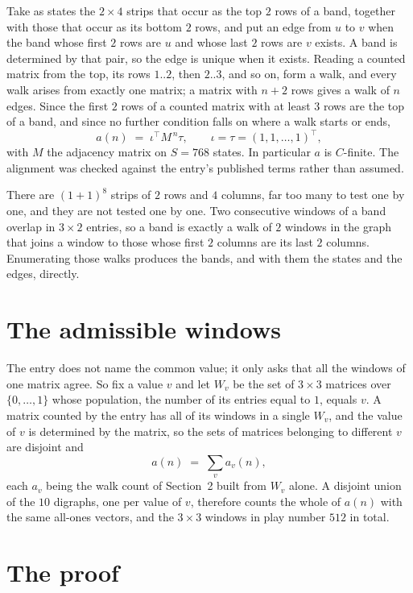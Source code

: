 \documentclass[11pt,a4paper]{article}
\theoremstyle{plain}
\theoremstyle{definition}
\begin{document}
Take as states the $2\times4$ strips that occur as the top $2$ rows of a band,
together with those that occur as its bottom $2$ rows, and put an edge from $u$ to $v$
when the band whose first $2$ rows are $u$ and whose last $2$ rows are $v$ exists.
A band is determined by that pair, so the edge is unique when it exists. Reading a counted
matrix from the top, its rows $1..2$, then $2..3$, and so on, form a walk, and every
walk arises from exactly one matrix; a matrix with $n+2$ rows gives a walk of $n$ edges.
Since the first $2$ rows of a counted matrix with at least $3$ rows are the top of a
band, and since no further condition falls on where a walk starts or ends,
\[
a(n)\;=\;\iota^{\!\top}M^{\,n}\tau ,\qquad \iota=\tau=(1,1,\dots,1)^{\!\top},
\]
with $M$ the adjacency matrix on $S=768$ states. In particular $a$ is $C$-finite. The
alignment was checked against the entry's published terms rather than assumed.

There are $(1 + 1)^{8}$ strips of $2$ rows and $4$ columns, far too
many to test one by one, and they are not tested one by one. Two consecutive windows of a band
overlap in $3\times2$ entries, so a band is exactly a walk of $2$ windows in
the graph that joins a window to those whose first $2$ columns are its last $2$
columns. Enumerating those walks produces the bands, and with them the states and the edges,
directly.

\section{The admissible windows}

The entry does not name the common value; it only asks that all the windows of one matrix agree.
So fix a value $v$ and let $W_v$ be the set of $3\times3$ matrices over
$\{0,\dots,1\}$ whose population, the number of its entries equal to $1$, equals $v$. A matrix counted by the entry has all of
its windows in a single $W_v$, and the value of $v$ is determined by the matrix, so the sets of
matrices belonging to different $v$ are disjoint and
\[
a(n)\;=\;\sum_v a_v(n),
\]
each $a_v$ being the walk count of Section~2 built from $W_v$ alone. A disjoint union of the
$10$ digraphs, one per value of $v$, therefore counts the whole of $a(n)$ with the same
all-ones vectors, and the $3\times3$ windows in play number $512$ in total.

\section{The proof}
\end{document}
